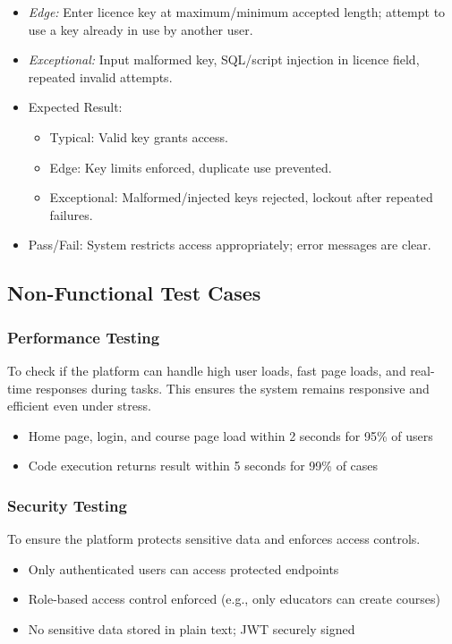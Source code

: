 \documentclass[a4paper,11pt]{scrartcl}
\begin{document}
\begin{enumerate}[leftmargin=*]
\begin{itemize}
            \item \emph{Edge:} Enter licence key at maximum/minimum accepted length; attempt to use a key already in use by another user.
            \item \emph{Exceptional:} Input malformed key, SQL/script injection in licence field, repeated invalid attempts.
            \item Expected Result:
                \begin{itemize}
                  \item Typical: Valid key grants access.
                  \item Edge: Key limits enforced, duplicate use prevented.
                  \item Exceptional: Malformed/injected keys rejected, lockout after repeated failures.
                \end{itemize}
            \item Pass/Fail: System restricts access appropriately; error messages are clear.
        \end{itemize}
\end{enumerate}

\subsection{Non-Functional Test Cases}

\subsubsection{Performance Testing}
To check if the platform can handle high user loads, fast page loads, and real-time responses during tasks. This ensures the system remains responsive and efficient even under stress.
\begin{itemize}[leftmargin=*]
    \item Home page, login, and course page load within 2 seconds for 95\% of users
    \item Code execution returns result within 5 seconds for 99\% of cases
\end{itemize}

\subsubsection{Security Testing}
To ensure the platform protects sensitive data and enforces access controls.
\begin{itemize}[leftmargin=*]
    \item Only authenticated users can access protected endpoints
    \item Role-based access control enforced (e.g., only educators can create courses)
    \item No sensitive data stored in plain text; JWT securely signed
\end{itemize}
\end{document}
